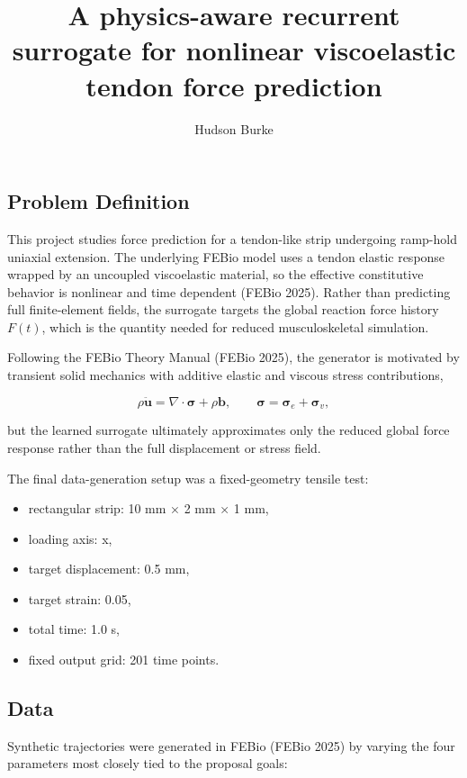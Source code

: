\documentclass[
  10pt,
  letterpaper,
  DIV=11,
  numbers=noendperiod]{scrartcl}
\title{A physics-aware recurrent surrogate for nonlinear viscoelastic
tendon force prediction}
\author{Hudson Burke}
\date{}
\providecommand{\tightlist}{%
  \setlength{\itemsep}{0pt}\setlength{\parskip}{0pt}}
\begin{document}
\maketitle


\subsection{Problem Definition}\label{problem-definition}

This project studies force prediction for a tendon-like strip undergoing
ramp-hold uniaxial extension. The underlying FEBio model uses a tendon
elastic response wrapped by an uncoupled viscoelastic material, so the
effective constitutive behavior is nonlinear and time dependent (FEBio
2025). Rather than predicting full finite-element fields, the surrogate
targets the global reaction force history \(F(t)\), which is the
quantity needed for reduced musculoskeletal simulation.

Following the FEBio Theory Manual (FEBio 2025), the generator is
motivated by transient solid mechanics with additive elastic and viscous
stress contributions,

\[
\rho \ddot{\mathbf{u}} = \nabla \cdot \boldsymbol{\sigma} + \rho \mathbf{b},
\qquad
\boldsymbol{\sigma} = \boldsymbol{\sigma}_e + \boldsymbol{\sigma}_v,
\]

but the learned surrogate ultimately approximates only the reduced
global force response rather than the full displacement or stress field.

The final data-generation setup was a fixed-geometry tensile test:

\begin{itemize}
\tightlist
\item
  rectangular strip: 10 mm × 2 mm × 1 mm,
\item
  loading axis: x,
\item
  target displacement: 0.5 mm,
\item
  target strain: 0.05,
\item
  total time: 1.0 s,
\item
  fixed output grid: 201 time points.
\end{itemize}

\subsection{Data}\label{data}

Synthetic trajectories were generated in FEBio (FEBio 2025) by varying
the four parameters most closely tied to the proposal goals:
\end{document}
